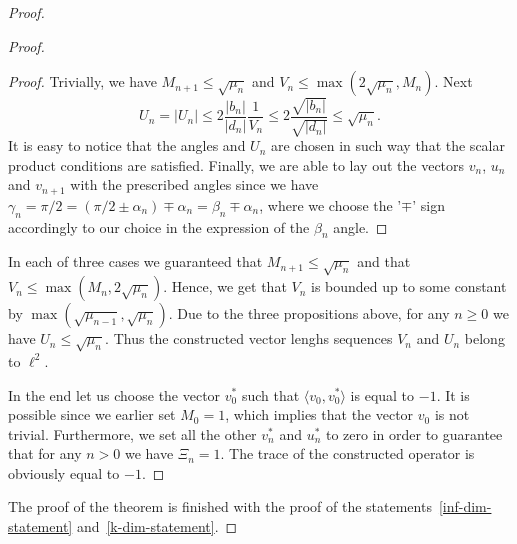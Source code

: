 \documentclass[12pt]{amsart}
\theoremstyle{case}
\begin{document}
\begin{proof}
\begin{proof}
\begin{proof}
          Trivially, we have $M_{n+1} \leq \sqrt{\mu_n}$ and $V_n \leq \max(2\sqrt{\mu_n}, M_n)$.
          Next
          \[
            U_n = |U_n| \leq 2 \frac{|b_n|}{|d_n|} \frac{1}{V_n} \leq 2 \frac{\sqrt{|b_n|}}{\sqrt{|d_n|}} \leq \sqrt{\mu_n}.
          \]
          It is easy to notice that the angles and $U_n$ are chosen in such way that the scalar product conditions are satisfied.
          Finally, we are able to lay out the vectors $v_n$, $u_n$ and $v_{n+1}$ with the prescribed angles 
            since we have $\gamma_n = \pi/2 = (\pi/2 \pm \alpha_n) \mp \alpha_n = \beta_n \mp \alpha_n$,
            where we choose the '$\mp$' sign accordingly to our choice in the expression of the $\beta_n$ angle.
        \end{proof}
      In each of three cases we guaranteed that $M_{n+1} \leq \sqrt{\mu_n}$ and
        that $V_n \leq \max(M_n, 2\sqrt{\mu_n})$.
      Hence, we get that $V_n$ is bounded up to some constant by $\max(\sqrt{\mu_{n-1}}, \sqrt{\mu_n})$.
      Due to the three propositions above, for any $n \geq 0$ we have $U_n \leq \sqrt{\mu_n}$.
      Thus the constructed vector lenghs sequences $V_n$ and $U_n$ belong to $\ell^2$.

      In the end let us choose the vector $v_0^*$ such that $\langle v_0, v_0^*\rangle$ is equal to $-1$.
      It is possible since we earlier set $M_0 = 1$, which implies that the vector $v_0$ is not trivial.
      Furthermore, we set all the other $v^*_n$ and $u^*_n$ to zero in order to guarantee that for any $n > 0$ we have $\Xi_n = 1$.
      The trace of the constructed operator is obviously equal to $-1$.
    \end{proof}
    The proof of the theorem is finished with the proof of the statements~\ref{inf-dim-statement} and~\ref{k-dim-statement}.
  \end{proof}
    
\end{document}
